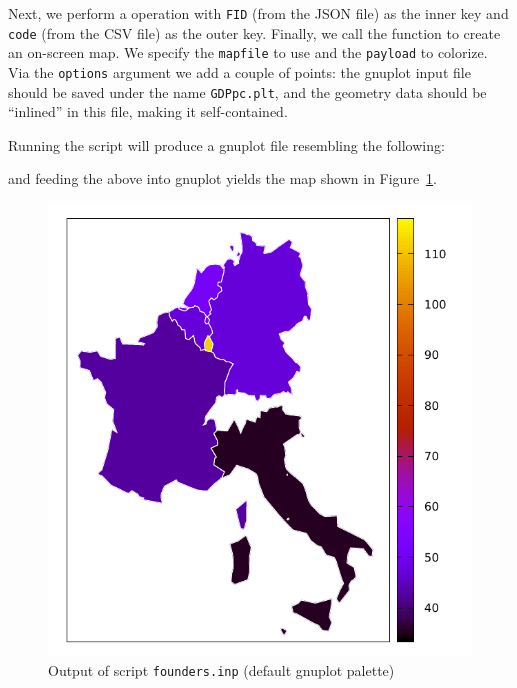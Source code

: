 \documentclass{article}
\begin{document}
Next, we perform a  operation with \texttt{FID} (from the
JSON file) as the inner key and \texttt{code} (from the CSV file) as
the outer key. Finally, we call the  function to create
an on-screen map. We specify the \texttt{mapfile} to use and the
\texttt{payload} to colorize. Via the \texttt{options} argument we add
a couple of points: the \textsf{gnuplot} input file should be saved
under the name \texttt{GDPpc.plt}, and the geometry data should be
``inlined'' in this file, making it self-contained.

Running the script will produce a \textsf{gnuplot} file resembling the
following:


and feeding the above into \textsf{gnuplot} yields the map shown in
Figure~\ref{fig:founders}.

\begin{figure}[htbp]
  \begin{center}
  \includegraphics[scale=0.9]{GDPpc.pdf}
\end{center}
\caption{Output of script \texttt{founders.inp} (default gnuplot palette)}
\label{fig:founders}
\end{figure}
\end{document}
